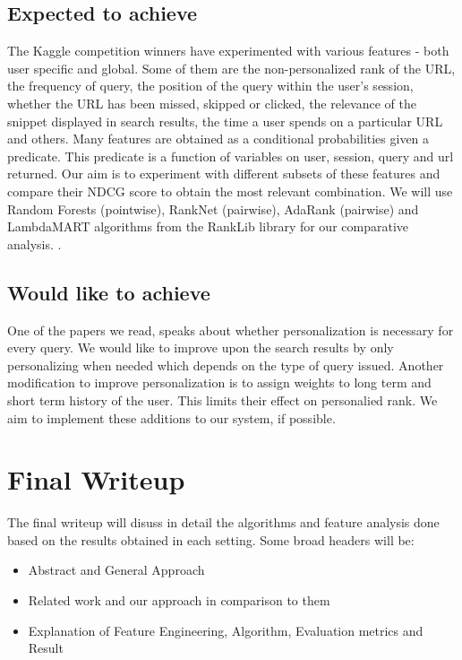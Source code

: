 \documentclass[11pt]{article}
\begin{document}
\subsection{Expected to achieve}
The Kaggle competition winners have experimented with various features - both user specific and global. Some of them are the non-personalized rank of the URL, the frequency of query, the position of the query within the user's session, whether the URL has been missed, skipped or clicked, the relevance of the snippet displayed in search results, the time a user spends on a particular URL and others. Many features are obtained as a conditional probabilities given a predicate. This predicate is a function of variables on user, session, query and url returned.%
\newline
Our aim is to experiment with different subsets of these features and compare their NDCG score to obtain the most relevant combination. We will use Random Forests (pointwise), RankNet (pairwise), AdaRank (pairwise) and LambdaMART algorithms from the RankLib library for our comparative analysis. .
\subsection{Would like to achieve}
One of the papers we read, speaks about whether personalization is necessary for every query. We would like to improve upon the search results by only personalizing when needed which depends on the type of query issued. Another modification to improve personalization is to assign weights to long term and short term history of the user. This limits their effect on personalied rank. We aim to implement these additions to our system, if possible.
\section{Final Writeup} The final writeup will disuss in detail the algorithms and feature analysis done based on the results obtained in each setting. Some broad headers will be:\\
\vspace{-5mm} 
\begin{itemize}\setlength{\itemsep}{-5pt}
\item Abstract and General Approach
\item Related work and our approach in comparison to them
\item Explanation of Feature Engineering, Algorithm, Evaluation metrics and Result  
\end{itemize}
\noindent
\end{document}
